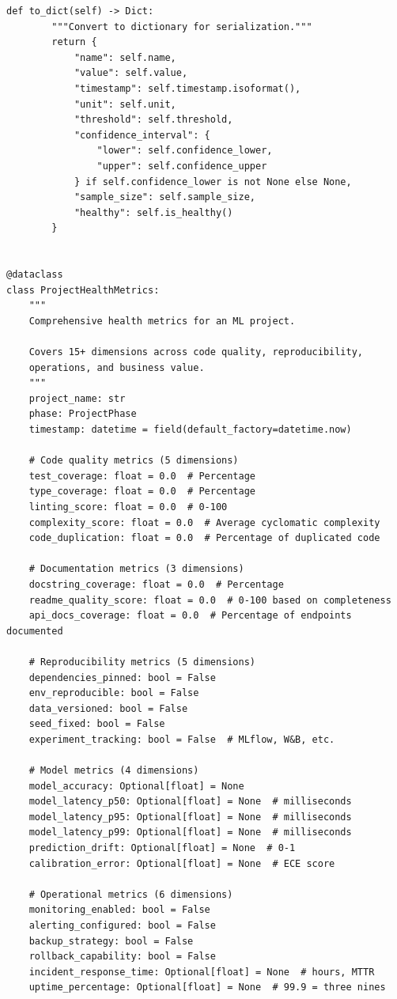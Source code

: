 \begin{lstlisting}[style=python, caption={Comprehensive project health metrics framework with 15+ dimensions}]
    def to_dict(self) -> Dict:
        """Convert to dictionary for serialization."""
        return {
            "name": self.name,
            "value": self.value,
            "timestamp": self.timestamp.isoformat(),
            "unit": self.unit,
            "threshold": self.threshold,
            "confidence_interval": {
                "lower": self.confidence_lower,
                "upper": self.confidence_upper
            } if self.confidence_lower is not None else None,
            "sample_size": self.sample_size,
            "healthy": self.is_healthy()
        }


@dataclass
class ProjectHealthMetrics:
    """
    Comprehensive health metrics for an ML project.

    Covers 15+ dimensions across code quality, reproducibility,
    operations, and business value.
    """
    project_name: str
    phase: ProjectPhase
    timestamp: datetime = field(default_factory=datetime.now)

    # Code quality metrics (5 dimensions)
    test_coverage: float = 0.0  # Percentage
    type_coverage: float = 0.0  # Percentage
    linting_score: float = 0.0  # 0-100
    complexity_score: float = 0.0  # Average cyclomatic complexity
    code_duplication: float = 0.0  # Percentage of duplicated code

    # Documentation metrics (3 dimensions)
    docstring_coverage: float = 0.0  # Percentage
    readme_quality_score: float = 0.0  # 0-100 based on completeness
    api_docs_coverage: float = 0.0  # Percentage of endpoints documented

    # Reproducibility metrics (5 dimensions)
    dependencies_pinned: bool = False
    env_reproducible: bool = False
    data_versioned: bool = False
    seed_fixed: bool = False
    experiment_tracking: bool = False  # MLflow, W&B, etc.

    # Model metrics (4 dimensions)
    model_accuracy: Optional[float] = None
    model_latency_p50: Optional[float] = None  # milliseconds
    model_latency_p95: Optional[float] = None  # milliseconds
    model_latency_p99: Optional[float] = None  # milliseconds
    prediction_drift: Optional[float] = None  # 0-1
    calibration_error: Optional[float] = None  # ECE score

    # Operational metrics (6 dimensions)
    monitoring_enabled: bool = False
    alerting_configured: bool = False
    backup_strategy: bool = False
    rollback_capability: bool = False
    incident_response_time: Optional[float] = None  # hours, MTTR
    uptime_percentage: Optional[float] = None  # 99.9 = three nines


\end{lstlisting}

